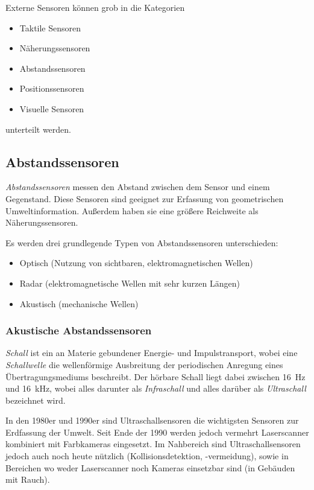 		Externe Sensoren können grob in die Kategorien
		\begin{itemize}
			\item Taktile Sensoren
			\item Näherungssensoren
			\item Abstandssensoren
			\item Positionssensoren
			\item Visuelle Sensoren
		\end{itemize}
		unterteilt werden.

		\subsection{Abstandssensoren}
			\emph{Abstandssensoren} messen den Abstand zwischen dem Sensor und einem Gegenstand. Diese Sensoren sind geeignet zur Erfassung von geometrischen Umweltinformation. Außerdem haben sie eine größere Reichweite als Näherungssensoren.
			
			Es werden drei grundlegende Typen von Abstandssensoren unterschieden:
			\begin{itemize}
				\item Optisch (Nutzung von sichtbaren, elektromagnetischen Wellen)
				\item Radar (elektromagnetische Wellen mit sehr kurzen Längen)
				\item Akustisch (mechanische Wellen)
			\end{itemize}

			\subsubsection{Akustische Abstandssensoren}
				\emph{Schall} ist ein an Materie gebundener Energie- und Impulstransport, wobei eine \emph{Schallwelle} die wellenförmige Ausbreitung der periodischen Anregung eines Übertragungsmediums beschreibt. Der hörbare Schall liegt dabei zwischen \SI{16}{\hertz} und \SI{16}{\kilo\hertz}, wobei alles darunter als \emph{Infraschall} und alles darüber als \emph{Ultraschall} bezeichnet wird.
				
				In den 1980er und 1990er sind Ultraschallsensoren die wichtigsten Sensoren zur Erdfassung der Umwelt. Seit Ende der 1990 werden jedoch vermehrt Laserscanner kombiniert mit Farbkameras eingesetzt. Im Nahbereich sind Ultraschallsensoren jedoch auch noch heute nützlich (Kollisionsdetektion, \bzw -vermeidung), sowie in Bereichen wo weder Laserscanner noch Kameras einsetzbar sind (\zB in Gebäuden mit Rauch).

